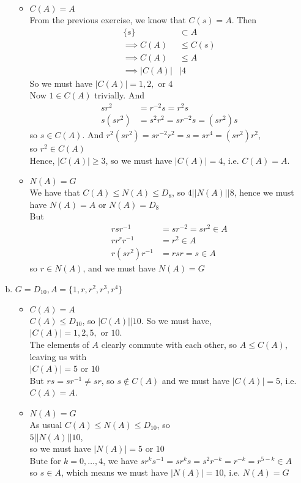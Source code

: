 \documentclass{article}
\newcommand{\set}[1]{ \{ #1 \} }
\newcommand{\inv}[1]{ {#1}^{-1} }
\newcommand{\norm}[1]{|#1|}
\newcommand{\divides}{\vert}
\begin{document}
\begin{enumerate}[(a)]
\begin{itemize}
\item $C(A) = A$\\
From the previous exercise, we know that $C(s) = A$. Then
\begin{align*}
\set{s} &\subset A\\
\implies C(A) &\leq C(s)\\
\implies C(A) &\leq A\\
\implies \norm{C(A)} &\divides 4
\end{align*}
So we must have $\norm{C(A)}=1,2,$ or $4$\\
Now $1\in C(A)$ trivially. And
\begin{align*}
sr^2 &= r^{-2}s =r^2s\\
s(sr^2) &= s^2r^2 = sr^{-2}s = (sr^2)s
\end{align*}
so $s \in C(A)$. And $r^2(sr^2) = sr^{-2}r^2 = s = sr^4 = (sr^2)r^2$,\\
so $r^2 \in C(A)$\\
Hence, $\norm{C(A)} \geq 3$, so we must have $\norm{C(A)} = 4$, i.e. $C(A)=A$.
\item $N(A)=G$\\
We have that $C(A) \leq N(A) \leq D_8$, so $4 \divides \norm{N(A)} \divides 8$, hence we must have $N(A)=A$ or $N(A)=D_8$\\
But
\begin{align*}
rs\inv{r} &= sr^{-2} = sr^2 \in A\\
rr^r\inv{r} &= r^2 \in A\\
r(sr^2)\inv{r} &= rsr = s \in A
\end{align*}
so $r \in N(A)$, and we must have $N(A)=G$
\end{itemize}
\item $G=D_{10},A=\set{1,r,r^2,r^3,r^4}$\\
\begin{itemize}
\item $C(A)=A$\\
$C(A) \leq D_{10}$, so $\norm{C(A)} \divides 10$. So we must have,\\
$\norm{C(A)} = 1,2,5,$ or $10$.\\
The elements of $A$ clearly commute with each other, so $A \leq C(A)$, leaving us with\\
$\norm{C(A)}=5$ or $10$\\
But $rs=s\inv{r} \neq sr$, so $s \notin C(A)$ and we must have $\norm{C(A)} = 5$, i.e. $C(A) = A$.
\item $N(A) = G$\\
As usual $C(A) \leq N(A) \leq D_{10}$, so\\
$5 \divides \norm{N(A)} \divides 10$,\\
so we must have $\norm{N(A)} = 5$ or $10$\\
Bute for $k=0,\ldots,4$, we have $sr^k\inv{s} = sr^ks=s^2r^{-k} = r^{-k} = r^{5-k} \in A$\\
so $s\in A$, which means we must have $\norm{N(A)} = 10$, i.e. $N(A) = G$
\end{itemize}
\end{enumerate}
\end{document}
